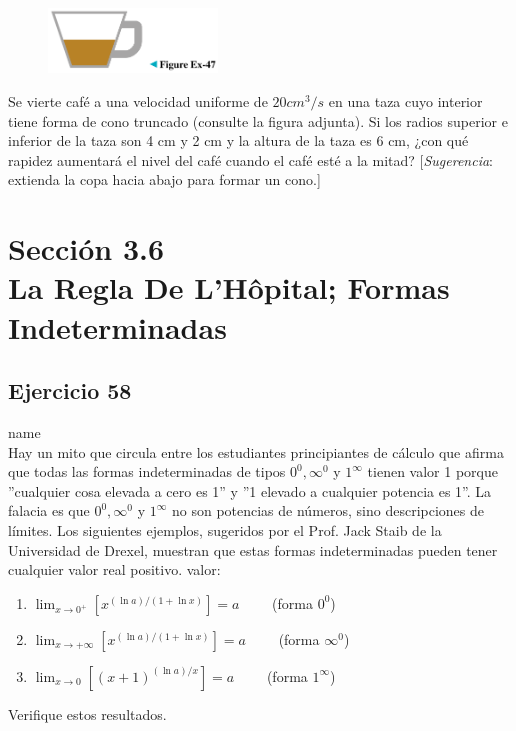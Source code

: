 \documentclass[12pt]{article}
\begin{document}
\begin{figure}[H]
\centering
\includegraphics[width=0.4\textwidth]{../img/img_Lista3/47.png}
\end{figure}
Se vierte café a una velocidad uniforme de $20 cm^3/s$ en una taza cuyo interior tiene forma de cono truncado (consulte la figura adjunta). Si los radios superior e inferior de la taza son 4 cm y 2 cm y la altura de la taza es 6 cm, ¿con qué rapidez aumentará el nivel del café cuando el café esté a la mitad? [\textit{Sugerencia}: extienda la copa hacia abajo para formar un cono.]

\section{Sección 3.6 \\ La Regla De L'Hôpital; Formas Indeterminadas} 
\subsection{Ejercicio 58} name \\

Hay un mito que circula entre los estudiantes principiantes de cálculo que afirma que todas las formas indeterminadas de tipos $0^0,\infty^0$ y $1^{\infty}$ tienen valor 1 porque ''cualquier cosa elevada a cero es 1'' y ''1 elevado a cualquier potencia es 1''. La falacia es que $0^0,\infty^0$ y $1^{\infty}$ no son potencias de números, sino descripciones de límites. Los siguientes ejemplos, sugeridos por el Prof. Jack Staib de la Universidad de Drexel, muestran que estas formas indeterminadas pueden tener cualquier valor real positivo.
valor:
\begin{enumerate}[label=(\alph*)]
\item $\lim_{x \to 0^+} [x^{(\ln a)/(1+\ln x)}]=a \qquad$ (forma $0^0$)
\item $\lim_{x \to +\infty} [x^{(\ln a)/(1+\ln x)}]=a \qquad$ (forma $\infty^0$)
\item $\lim_{x \to 0} [(x+1)^{(\ln a)/x}]=a \qquad$ (forma $1^{\infty}$)
\end{enumerate}
Verifique estos resultados.
\end{document}
